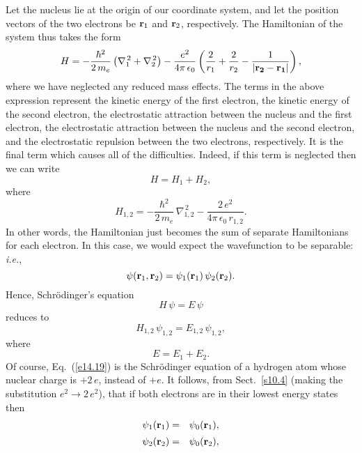 Let the nucleus lie at the origin of our coordinate
system, and let the position vectors of the two electrons be ${\bf r}_1$
and ${\bf r}_2$, respectively. The Hamiltonian of the system thus
takes the form
\begin{equation}\label{e14.14}
H = -\frac{\hbar^2}{2\,m_e}\left(\nabla_1^{\,2} + \nabla_2^{\,2}\right)
- \frac{e^2}{4\pi\,\epsilon_0}\left(\frac{2}{r_1}+\frac{2}{r_2}-
\frac{1}{|{\bf r_2}-{\bf r_1}|}\right),
\end{equation}
where we have neglected any reduced mass effects.
The terms in the above expression represent the kinetic energy of the first
electron, the kinetic energy of the second electron, the electrostatic
attraction between the nucleus and the first electron, the electrostatic
attraction between the nucleus and the second electron, and the
electrostatic repulsion between the two electrons, respectively.
It is the final term which causes all of the difficulties. Indeed, if this
term is neglected then we can write
\begin{equation}
H = H_1 + H_2,
\end{equation}
where
\begin{equation}
H_{1,2} = -\frac{\hbar^2}{2\,m_e}\,\nabla^{\,2}_{1,2} -\frac{2\,e^2}{4\pi\,\epsilon_0\,r_{1,2}}.
\end{equation}
In other words, the Hamiltonian  just becomes the sum of separate Hamiltonians for each electron. In this case, we would expect the
wavefunction to  be separable: {\em i.e.},
\begin{equation}
\psi({\bf r}_1,{\bf r}_2) = \psi_1({\bf r}_1)\,\psi_2({\bf r}_2). 
\end{equation}
Hence, Schr\"{o}dinger's equation
\begin{equation}
H\,\psi = E\,\psi
\end{equation}
reduces to
\begin{equation}\label{e14.19}
H_{1,2}\,\psi_{1,2} = E_{1,2}\,\psi_{1,2},
\end{equation}
where
\begin{equation}
E = E_1 + E_2.
\end{equation}
Of course, Eq.~(\ref{e14.19}) is the Schr\"{o}dinger equation of a hydrogen atom whose
nuclear charge is $+2\,e$, instead of $+e$. It follows, from Sect.~\ref{s10.4} (making the substitution $e^2\rightarrow 2\,e^2$), that if both electrons are in their lowest energy
states then
\begin{eqnarray}
\psi_1({\bf r}_1) &=& \psi_0({\bf r}_1),\\[0.5ex]
\psi_2({\bf r}_2)&=& \psi_0({\bf r}_2),
\end{eqnarray}
